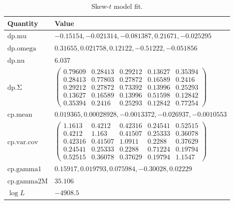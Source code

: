 \begin{table}[ht]
\centering
\begin{tabular}{ll}
\toprule
Quantity & Value \\
\midrule
$\mathrm{dp.mu}$ & $-0.15154, -0.021314, -0.081387, 0.21671, -0.025295$ \\
$\mathrm{dp.omega}$ & $0.31655, 0.021758, 0.12122, -0.51222, -0.051856$ \\
$\mathrm{dp.nu}$ & $6.037$ \\
$\mathrm{dp.\Sigma}$ & $\begin{pmatrix}0.79609 & 0.28413 & 0.29212 & 0.13627 & 0.35394\\0.28413 & 0.77803 & 0.27872 & 0.16589 & 0.2416\\0.29212 & 0.27872 & 0.73392 & 0.13996 & 0.25293\\0.13627 & 0.16589 & 0.13996 & 0.51598 & 0.12842\\0.35394 & 0.2416 & 0.25293 & 0.12842 & 0.77254\end{pmatrix}$ \\
$\mathrm{cp.mean}$ & $0.019365, 0.00028928, -0.0013372, -0.026937, -0.0010553$ \\
$\mathrm{cp.var.cov}$ & $\begin{pmatrix}1.1613 & 0.4212 & 0.42316 & 0.24541 & 0.52515\\0.4212 & 1.163 & 0.41507 & 0.25333 & 0.36078\\0.42316 & 0.41507 & 1.0911 & 0.2288 & 0.37629\\0.24541 & 0.25333 & 0.2288 & 0.71224 & 0.19794\\0.52515 & 0.36078 & 0.37629 & 0.19794 & 1.1547\end{pmatrix}$ \\
$\mathrm{cp.gamma1}$ & $0.15917, 0.019793, 0.075984, -0.30028, 0.02229$ \\
$\mathrm{cp.gamma2M}$ & $35.106$ \\
$\log L$ & $-4908.5$ \\
\bottomrule
\end{tabular}
\caption{Skew-$t$ model fit.}
\end{table}